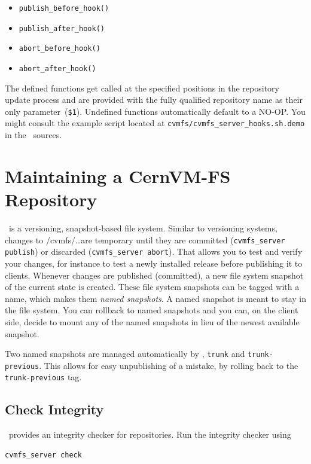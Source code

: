 \begin{itemize}
	\item \texttt{publish\_before\_hook()}
	\item \texttt{publish\_after\_hook()}
\end{itemize}
\begin{itemize}
	\item \texttt{abort\_before\_hook()}
	\item \texttt{abort\_after\_hook()}
\end{itemize}
The defined functions get called at the specified positions in the repository update process and are provided with the fully qualified repository name as their only parameter~(\texttt{\$1}).
Undefined functions automatically default to a NO-OP.
You might consult the example script located at \texttt{cvmfs/cvmfs\_server\_hooks.sh.demo} in the \cvmfs\ sources.


\section{Maintaining a CernVM-FS Repository}

\cvmfs\ is a versioning, snapshot-based file system.
Similar to versioning systems, changes to /cvmfs/\dots are temporary until they are committed (\texttt{cvmfs\_server publish}) or discarded (\texttt{cvmfs\_server abort}).
That allows you to test and verify your changes, for instance to test a newly installed release before publishing it to clients.
Whenever changes are published (committed), a new file system snapshot of the current state is created.
These file system snapshots can be tagged with a name, which makes them \emph{named snapshots}.
A named snapshot is meant to stay in the file system.
You can rollback to named snapshots and you can, on the client side, decide to mount any of the named snapshots in lieu of the newest available snapshot.

Two named snapshots are managed automatically by \cvmfs, \texttt{trunk} and \texttt{trunk-previous}.
This allows for easy unpublishing of a mistake, by rolling back to the \texttt{trunk-previous} tag.

\subsection{Check Integrity}
\label{sct:checkintegrity}
\cvmfs\ provides an integrity checker for repositories.
Run the integrity checker using
\begin{verbatim}
cvmfs_server check
\end{verbatim}


